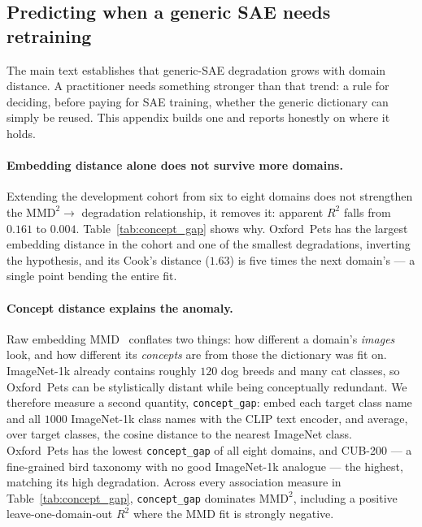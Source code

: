 












\subsection{Predicting when a generic SAE needs retraining}
\label{app:when-to-retrain}

The main text establishes that generic-SAE degradation grows with domain distance. A
practitioner needs something stronger than that trend: a rule for deciding, before
paying for SAE training, whether the generic dictionary can simply be reused. This
appendix builds one and reports honestly on where it holds.

\paragraph{Embedding distance alone does not survive more domains.}
Extending the development cohort from six to eight domains does not strengthen the
$\mathrm{MMD}^2 \rightarrow$ degradation relationship, it removes it: apparent $R^2$
falls from $0.161$ to $0.004$. Table~\ref{tab:concept_gap} shows why. Oxford~Pets has
the largest embedding distance in the cohort and one of the smallest degradations,
inverting the hypothesis, and its Cook's distance ($1.63$) is five times the next
domain's --- a single point bending the entire fit.

\paragraph{Concept distance explains the anomaly.}
Raw embedding MMD~\citep{gretton2012kernel} conflates two things: how different a
domain's \emph{images} look, and how different its \emph{concepts} are from those the
dictionary was fit on. ImageNet-1k already contains roughly $120$ dog breeds and many
cat classes, so Oxford~Pets can be stylistically distant while being conceptually
redundant. We therefore measure a second quantity, \texttt{concept\_gap}: embed each
target class name and all $1000$ ImageNet-1k class names with the CLIP text encoder,
and average, over target classes, the cosine distance to the nearest ImageNet class.
Oxford~Pets has the lowest \texttt{concept\_gap} of all eight domains, and CUB-200 --- a
fine-grained bird taxonomy with no good ImageNet-1k analogue --- the highest, matching
its high degradation. Across every association measure in Table~\ref{tab:concept_gap},
\texttt{concept\_gap} dominates $\mathrm{MMD}^2$, including a positive leave-one-domain-out
$R^2$ where the MMD fit is strongly negative.

